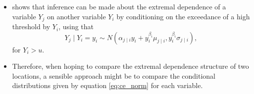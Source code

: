 \documentclass{article}
\numberwithin{equation}{section}
\begin{document}
\begin{itemize}
 \item \citet{Heffernan2004} shows that inference can be made about the extremal dependence of a variable $Y_j$ on another variable $Y_i$ by conditioning on the exceedance of a high threshold by $Y_i$, using that
    \begin{equation} \label{eq:ce_norm}
      Y_{j} \mid Y_{i} = y_i \sim N\left(\alpha_{j \mid i} y_i + y_i^{\beta_i} \mu_{j \mid i}, y_i^{\beta_i} \sigma_{j \mid i}\right),
    \end{equation}
for $Y_i > u$.
  \item Therefore, when hoping to compare the extremal dependence structure of two locations, a sensible approach might be to compare the conditional distributions given by equation \ref{eq:ce_norm} for each variable. 
\end{itemize}

\vspace{1cm}
\end{document}

